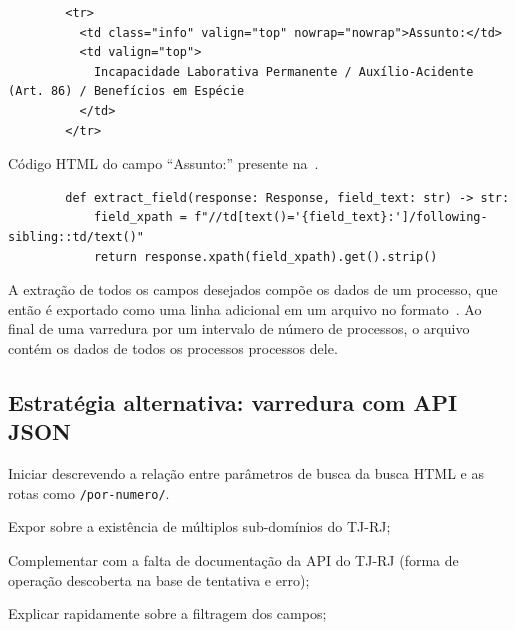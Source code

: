 \begin{listing}
    \centering{}
    \begin{verbatim}
        <tr>
          <td class="info" valign="top" nowrap="nowrap">Assunto:</td>
          <td valign="top">
            Incapacidade Laborativa Permanente / Auxílio-Acidente (Art. 86) / Benefícios em Espécie
          </td>
        </tr>
    \end{verbatim}
    \caption{Código HTML do campo ``Assunto:'' presente na~.}
    \label{cod:html-assunto}
\end{listing}

\begin{listing}[htb]
    \centering{}
    \begin{verbatim}
        def extract_field(response: Response, field_text: str) -> str:
            field_xpath = f"//td[text()='{field_text}:']/following-sibling::td/text()"
            return response.xpath(field_xpath).get().strip()
    \end{verbatim}
    \caption{%
        Código da função responsável pela extração de um campo em uma resposta
        de uma requisição a uma página de visualização de processo.
    }
    \label{cod:extract_field}
\end{listing}

A extração de todos os campos desejados compõe os dados de um processo, que
então é exportado como uma linha adicional em um arquivo no
formato~\cite{spec:jsonlines}. Ao final de uma varredura por um intervalo de
número de processos, o arquivo contém os dados de todos os processos processos
dele.

\subsection{Estratégia alternativa: varredura com API JSON}

\begin{todolist}
    \item Iniciar descrevendo a relação entre parâmetros de busca da busca HTML
          e as rotas como \texttt{/por-numero/}.
    \item Expor sobre a existência de múltiplos sub-domínios do TJ-RJ;
    \item Complementar com a falta de documentação da API do TJ-RJ (forma de
          operação descoberta na base de tentativa e erro);
    \item Explicar rapidamente sobre a filtragem dos campos;
\end{todolist}

